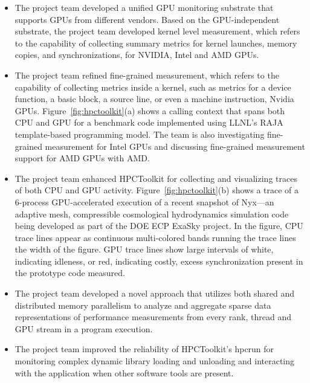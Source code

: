 \begin{itemize}

\item
The project team developed a unified GPU monitoring substrate that supports GPUs from different vendors.
Based on the GPU-independent substrate, the project team developed kernel level measurement, 
which refers to the capability of collecting summary metrics for kernel launches, memory copies, and synchronizations,
for NVIDIA, Intel and AMD GPUs.

\item
The project team refined fine-grained measurement, which refers to the capability of collecting metrics inside a kernel, such as metrics for a device function, a basic block, a source line, or even a machine instruction, Nvidia GPUs.
Figure~\ref{fig:hpctoolkit}(a) shows a calling context that spans both CPU and GPU for a benchmark code implemented using LLNL's RAJA template-based programming model.
The team is also investigating fine-grained measurement for Intel GPUs and discussing fine-grained measurement support for AMD GPUs with AMD.

\item
The project team enhanced HPCToolkit for collecting and visualizing traces of both CPU and GPU activity.
Figure~\ref{fig:hpctoolkit}(b) shows a trace of a 6-process GPU-accelerated execution of a recent snapshot of Nyx---an adaptive mesh, compressible cosmological hydrodynamics simulation code being developed as part of the DOE ECP ExaSky project. In the figure, CPU trace lines appear as continuous multi-colored bands running the  trace lines the width of the figure. GPU trace lines show large intervals of white, indicating idleness, or red, indicating costly, excess synchronization present in the prototype code measured.

\item
The project team developed a novel approach that utilizes both shared and distributed memory parallelism to analyze and aggregate sparse data representations of performance measurements from every rank, thread and GPU stream in a program execution. 

\item 
The project team improved the reliability of HPCToolkit's hpcrun for monitoring complex dynamic library loading and unloading and interacting with the application when other software tools are present.

\end{itemize}

